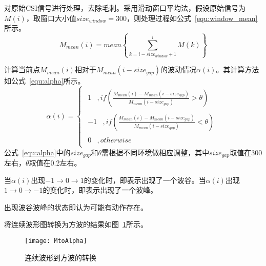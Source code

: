\begin{compactenum}
\item 对原始CSI信号进行处理，去除毛刺。采用滑动窗口平均法，假设原始信号为$M \left( i \right)$，取窗口大小值$size_{window} = 300$，则处理过程如公式~\ref{equ:window_mean}所示。
\begin{equation}
\label{equ:window_mean}
{M_{mean}}\left( i \right) = mean\left\{ {\sum\limits_{k = i - size_{window} + 1}^i {M\left( k \right)} } \right\}
\end{equation}

\item 计算当前点${M_{mean}}\left( i \right)$相对于${M_{mean}}\left( i - size_{gap} \right)$的波动情况$\alpha \left( i \right)$。其计算方法如公式~\ref{equ:alpha}所示。
\begin{equation}
\label{equ:alpha}
\alpha \left( i \right) = \left\{ {\begin{array}{*{20}{c}}
{\begin{array}{*{20}{c}}
1&{,if\left( {\frac{{{M_{mean}}\left( i \right) - {M_{mean}}\left( {i - siz{e_{gap}}} \right)}}{{{M_{mean}}\left( {i - siz{e_{gap}}} \right)}} > \theta } \right)}
\end{array}}\\
{\begin{array}{*{20}{c}}
{ - 1}&{,if\left( {\frac{{{M_{mean}}\left( i \right) - {M_{mean}}\left( {i - siz{e_{gap}}} \right)}}{{{M_{mean}}\left( {i - siz{e_{gap}}} \right)}} < \theta } \right)}
\end{array}}\\
{\begin{array}{*{20}{c}}
0&{,otherwise}
\end{array}}
\end{array}} \right.
\end{equation}
公式~\ref{equ:alpha}中的$size_{gap}$和$\theta$需根据不同环境做相应调整，其中$size_{gap}$取值在300左右，$\theta$取值在0.2左右。

\item 当$\alpha \left( i \right)$出现$ - 1 \to 0 \to 1$的变化时，即表示出现了一个波谷。当$\alpha \left( i \right)$出现$1 \to 0 \to - 1$的变化时，即表示出现了一个波峰。

\item 出现波谷波峰的状态即认为可能有动作存在。
\end{compactenum}

将连续波形图转换为方波的结果如图~\ref{fig:MtoAlpha}所示。
\begin{figure}[htbp] %
  \centering
  \texttt{[image: MtoAlpha]}
  \caption{连续波形到方波的转换}
  \label{fig:MtoAlpha}
\end{figure}

